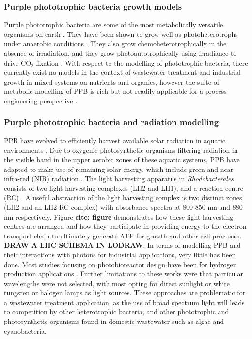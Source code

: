 \subsubsection{Purple phototrophic bacteria growth models}
Purple phototrophic bacteria are some of the most metabolically versatile organisms on earth \cite{hunter2008}. They have been shown to grow well as photoheterotrophs under anaerobic conditions \cite{hulsen2014}. They also grow chemoheterotrophically in the absence of irradiation, and they grow photoautotrophically using irradiance to drive $\mathrm{CO_2}$ fixation \cite{gordon2014}. With respect to the modelling of phototrophic bacteria, there currently exist no models in the context of wastewater treatment and industrial growth in mixed systems on nutrients and organics, however the suite of metabolic modelling of PPB is rich but not readily applicable for a process engineering perspective \cite{klamt2002}.
\subsubsection{Purple phototrophic bacteria and radiation modelling}
PPB have evolved to efficiently harvest available solar radiation in aquatic environments \cite{cogdell2006}. Due to oxygenic photosynthetic organisms filtering radiation in the visible band in the upper aerobic zones of these aquatic systems, PPB have adapted to make use of remaining solar energy, which include green and near infra-red (NIR) radiation \cite{cogdell2006}. The light harvesting apparatus in \textit{Rhodobacterales} consists of two light harvesting complexes (LH2 and LH1), and a reaction centre (RC) \cite{hellingwerf1994}. A useful abstraction of the light harvesting complex is two distinct zones (LH2 and an LH2-RC complex) with absorbance spectra at 800-850 \si{nm} and 880 \si{nm} respectively. Figure \textbf{cite: figure} demonstrates how these light harvesting centres are arranged and how they participate in providing energy to the electron transport chain to ultimately generate ATP for growth and other cell processes. \textbf{DRAW A LHC SCHEMA IN LODRAW}.
\skippingparagraph
In terms of modelling PPB and their interactions with photons for industrial applications, very little has been done. Most studies focusing on photobioreactor design have been for hydrogen production applications \cite{adessi2014, krujatz2015}. Further limitations to these works were that particular wavelengths were not selected, with most opting for direct sunlight or white tungsten or halogen lamps as light sources. These approaches are problematic for a wastewater treatment application, as the use of broad spectrum light will leads to competition by other heterotrophic bacteria, and other phototrophic and photosynthetic organisms found in domestic wastewater such as algae and cyanobacteria.
\skippingparagraph

